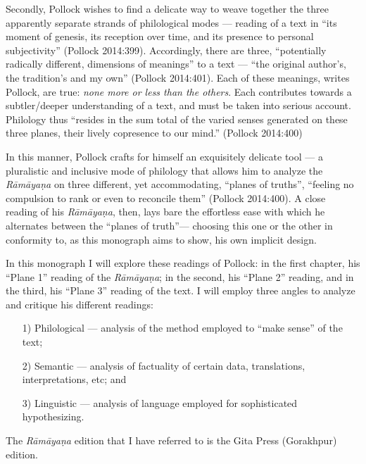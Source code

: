 Secondly, Pollock wishes to find a delicate way to weave together the three apparently separate strands of philological modes --- reading of a text in “its moment of genesis, its reception over time, and its presence to personal subjectivity” (Pollock 2014:399). Accordingly, there are three, “potentially radically different, dimensions of meanings” to a text --- “the original author’s, the tradition’s and my own” (Pollock 2014:401). Each of these meanings, writes Pollock, are true: {\sl none more or less than the others}. Each contributes towards a subtler/deeper understanding of a text, and must be taken into serious account. Philology thus “resides in the sum total of the varied senses generated on these three planes, their lively copresence to our mind.” (Pollock 2014:400)  

In this manner, Pollock crafts for himself an exquisitely delicate tool --- a pluralistic and inclusive mode of philology that allows him to analyze the {\sl Rāmāyaṇa} on three different, yet accommodating, “planes of truths”, “feeling no compulsion to rank or even to reconcile them” (Pollock 2014:400). A close reading of his {\sl Rāmāyaṇa}, then, lays bare the effortless ease with which he alternates between the “planes of truth”--- choosing this one or the other in conformity to, as this monograph aims to show, his own implicit design. 

In this monograph I will explore these readings of Pollock: in the first chapter, his “Plane 1” reading of the {\sl Rāmāyaṇa}; in the second, his “Plane 2” reading, and in the third, his “Plane 3” reading of the text. I will employ three angles to analyze and critique his different readings: 
\begin{itemize}
\itemsep=1pt
\item[1)] Philological --- analysis of the method employed to “make sense” of the text; 

\item[2)] Semantic --- analysis of factuality of certain data, translations, interpretations, etc; and

\item[3)] Linguistic --- analysis of language employed for sophisticated hypothesizing.
\end{itemize}

The {\sl Rāmāyaṇa} edition that I have referred to is the Gita Press (Gorakhpur) edition.


